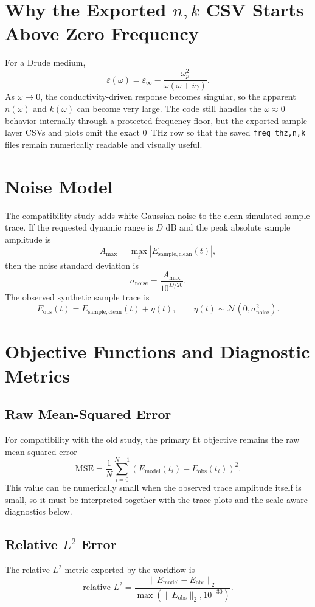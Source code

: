 \documentclass[11pt]{article}
\begin{document}
\section{Why the Exported \(n,k\) CSV Starts Above Zero Frequency}
For a Drude medium,
\[
\varepsilon(\omega)
=
\varepsilon_\infty
- \frac{\omega_p^2}{\omega(\omega+i\gamma)}.
\]
As \(\omega \to 0\), the conductivity-driven response becomes singular, so the apparent
\(n(\omega)\) and \(k(\omega)\) can become very large. The code still handles the
\(\omega \approx 0\) behavior internally through a protected frequency floor, but the exported
sample-layer CSVs and plots omit the exact \SI{0}{\tera\hertz} row so that the saved
\texttt{freq\_thz,n,k} files remain numerically readable and visually useful.

\section{Noise Model}
The compatibility study adds white Gaussian noise to the clean simulated sample trace. If the
requested dynamic range is \(D\) dB and the peak absolute sample amplitude is
\[
A_{\max} = \max_t |E_{\mathrm{sample,clean}}(t)|,
\]
then the noise standard deviation is
\[
\sigma_{\mathrm{noise}} = \frac{A_{\max}}{10^{D/20}}.
\]
The observed synthetic sample trace is
\[
E_{\mathrm{obs}}(t) = E_{\mathrm{sample,clean}}(t) + \eta(t),
\qquad
\eta(t) \sim \mathcal{N}(0,\sigma_{\mathrm{noise}}^2).
\]

\section{Objective Functions and Diagnostic Metrics}
\subsection{Raw Mean-Squared Error}
For compatibility with the old study, the primary fit objective remains the raw mean-squared
error
\[
\mathrm{MSE}
=
\frac{1}{N}\sum_{i=0}^{N-1}
\left(E_{\mathrm{model}}(t_i)-E_{\mathrm{obs}}(t_i)\right)^2.
\]
This value can be numerically small when the observed trace amplitude itself is small, so it
must be interpreted together with the trace plots and the scale-aware diagnostics below.

\subsection{Relative \texorpdfstring{$L^2$}{L2} Error}
The relative \(L^2\) metric exported by the workflow is
\[
\mathrm{relative\_}L^2
=
\frac{\lVert E_{\mathrm{model}}-E_{\mathrm{obs}}\rVert_2}
{\max\!\left(\lVert E_{\mathrm{obs}}\rVert_2,10^{-30}\right)}.
\]
\end{document}

